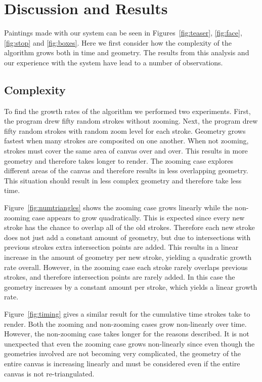\documentclass[review]{acmsiggraph}
\begin{document}
\section{Discussion and Results}
Paintings made with our system can be seen in Figures~\ref{fig:teaser}, \ref{fig:face},  \ref{fig:stop} and \ref{fig:boxes}.  Here we first consider how the complexity of the algorithm grows both in time and geometry.
The results from this analysis and our experience with the system have lead to a number of observations.

\subsection{Complexity}
To find the growth rates of the algorithm we performed two experiments. 
First, the program drew fifty random strokes without zooming.
Next, the program drew fifty random strokes with random zoom level for each stroke.
Geometry grows fastest when many strokes are composited on one another. When not zooming, strokes
must cover the same area of canvas over and over. This
results in more geometry and therefore takes longer to render. The zooming case explores different
areas of the canvas and therefore results in less overlapping geometry. This situation should result
in less complex geometry and therefore take less time.

Figure~\ref{fig:numtriangles} shows the zooming case grows linearly while the non-zooming case
appears to grow quadratically. This is expected since every new stroke has the chance to overlap
all of the old strokes. Therefore each new stroke does not just add a constant amount of geometry, but 
due to intersections with previous strokes extra intersection points are added. This results in a linear
increase in the amount of geometry per new stroke, yielding a quadratic growth rate overall. 
However, in the zooming case each stroke rarely overlaps previous strokes, and therefore
intersection points are rarely added. In this case the geometry increases by a constant amount per stroke, which yields a linear growth rate.

Figure~\ref{fig:timing} gives a similar result for the cumulative time strokes take to render. Both
the zooming and non-zooming cases grow non-linearly over time. However, the non-zooming case takes
longer for the reasons described. It is not unexpected that even the zooming case grows non-linearly
since even though the geometries involved are not becoming very complicated, the geometry of the entire
canvas is increasing linearly and must be considered even if the entire canvas is not re-triangulated.
\end{document}
